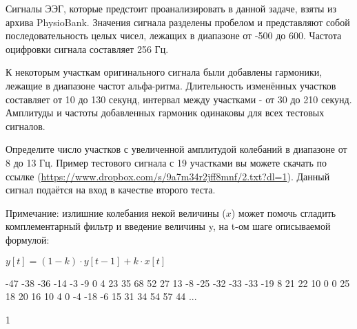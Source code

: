
Сигналы ЭЭГ, которые предстоит проанализировать в данной задаче, взяты из архива PhysioBank. 
Значения сигнала разделены пробелом и представляют собой последовательность целых чисел, 
лежащих в диапазоне от -500 до 600. Частота оцифровки сигнала составляет 256 Гц.

К некоторым участкам оригинального сигнала были добавлены гармоники, лежащие в диапазоне 
частот альфа-ритма. Длительность изменённых участков составляет от 10 до 130 секунд, 
интервал между участками - от 30 до 210 секунд. Амплитуды и частоты добавленных гармоник 
одинаковы для всех тестовых сигналов.

Определите число участков с увеличенной амплитудой колебаний в диапазоне от 8 до 13 Гц. 
Пример тестового сигнала с 19 участками вы можете скачать по ссылке (\url{https://www.dropbox.com/s/9a7m34r2jff8mnf/2.txt?dl=1}). Данный сигнал подаётся на вход в 
качестве второго теста.

Примечание: излишние колебания некой величины ($x$) может помочь сгладить комплементарный фильтр и введение величины y, на t-ом шаге описываемой формулой:

$y[t] = (1-k)\cdot y[t-1] + k\cdot x[t]$


\begin{myverbbox}[\small]{\vinput}
    -47 -38 -36 -14 -3 -9 0 4 23 35 68 52 27 13 -8 
    -25 -32 -33 -33 -19 8 21 22 10 0 0 25 18 20 16 
    10 4 0 -4 -18 -6 15 31 34 54 57 44
    ... 
\end{myverbbox}
\begin{myverbbox}[\small]{\voutput}
   1
\end{myverbbox}

